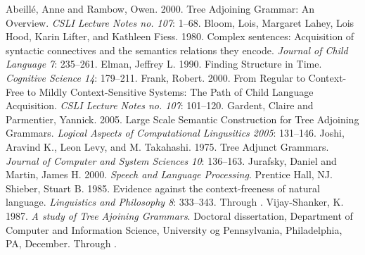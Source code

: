 \documentclass[12pt]{article}
\begin{document}
\singlespace
\begin{thebibliography}{4in}
 Abeill\'e, Anne and Rambow, Owen.  2000.  Tree
Adjoining Grammar: An Overview.  \textit{CSLI Lecture Notes no. 107}:
1--68.
 Bloom, Lois, Margaret Lahey, Lois Hood, Karin
Lifter, and Kathleen Fiess.  1980.  Complex sentences: Acquisition of
syntactic connectives and the semantics relations they encode.
\textit{Journal of Child Language 7}: 235--261.
 Elman, Jeffrey L.  1990.  Finding Structure in
Time.  \textit{Cognitive Science 14}: 179--211.
 Frank, Robert.  2000.  From Regular to Context-Free
to Mildly Context-Sensitive Systems: The Path of Child Language
Acquisition.  \textit{CSLI Lecture Notes no. 107}: 101--120.
 Gardent, Claire and Parmentier, Yannick.  2005.
Large Scale Semantic Construction for Tree Adjoining Grammars.
\textit{Logical Aspects of Computational Lingusitics 2005}: 131--146.
 Joshi, Aravind K., Leon Levy, and M. Takahashi.
1975. Tree Adjunct Grammars. \textit{Journal of Computer and System
Sciences 10}: 136--163.
 Jurafsky, Daniel and Martin, James H. 2000.
\textit{Speech and Language Processing}.  Prentice Hall, NJ.
 Shieber, Stuart B.  1985. Evidence against the
context-freeness of natural language.  \textit{Linguistics and
Philosophy 8}: 333--343.  Through \cite{Abeille-2000}.
 Vijay-Shanker, K. 1987.  \textit{A study of
Tree Ajoining Grammars}.  Doctoral dissertation, Department of Computer
and Information Science, University og Pennsylvania, Philadelphia, PA,
December.  Through \cite{Abeille-2000}.
\end{thebibliography}
\end{document}
